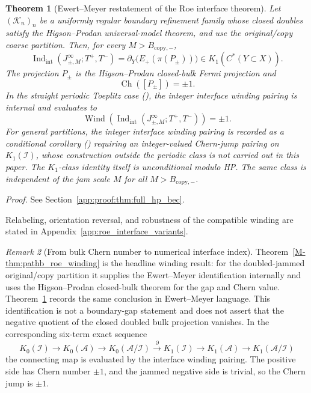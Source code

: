\documentclass[11pt]{article}
\numberwithin{equation}{section}
\newtheorem{theorem}{Theorem}[section]
\theoremstyle{definition}
\theoremstyle{remark}
\newtheorem{remark}[theorem]{Remark}
\newcommand{\proofref}[1]{%
  \par\noindent\emph{Proof.} See Section~\ref{#1}.\par\medskip
}
\newcommand{\proofappendixref}[1]{\proofref{#1}}
\newcommand{\K}{\mathcal{K}}
\newcommand{\Indint}{\operatorname{Ind}_{\mathrm{int}}}
\newcommand{\Ch}{\operatorname{Ch}}
\begin{document}
\begin{theorem}[Ewert--Meyer restatement of the Roe interface theorem]\label{thm:full_hp_bec}
Let \((\K_n)_n\) be a uniformly regular boundary refinement family whose closed doubles satisfy the
Higson--Prodan universal-model theorem, and use the original/copy coarse partition. Then, for every
\(M>B_{\mathrm{copy},-}\),
\[
\Indint(J_{\pm,M}^\infty;T^+,T^-)
=
\partial_Y\!\bigl(E_+(\pi(P_\pm))\bigr)
\in K_1(C^*(Y\subset X)).
\]
The projection \(P_\pm\) is the Higson--Prodan closed-bulk Fermi projection and
\[
\Ch([P_\pm])=\pm1.
\]
In the straight periodic Toeplitz case (), the integer interface
winding pairing is internal and evaluates to
\[
\operatorname{Wind}\!\left(
\Indint(J_{\pm,M}^\infty;T^+,T^-)
\right)
=\pm1.
\]
For general partitions, the integer interface winding pairing is recorded as a conditional
corollary () requiring an integer-valued Chern-jump
pairing on \(K_1(\mathcal I)\), whose construction outside the periodic class is not carried
out in this paper. The \(K_1\)-class identity itself is unconditional modulo HP.  The same
class is independent of the jam scale \(M\) for all \(M>B_{\mathrm{copy},-}\).
\end{theorem}
\proofappendixref{app:proof:thm:full_hp_bec}




Relabeling, orientation reversal, and robustness of the compatible winding are stated in Appendix~\ref{app:roe_interface_variants}.

\begin{remark}[From bulk Chern number to numerical interface index]\label{rem:chern_to_interface}
Theorem~\ref{M-thm:pathb_roe_winding} is the headline winding result: for the doubled-jammed
original/copy partition it supplies the Ewert--Meyer identification internally and uses the
Higson--Prodan closed-bulk theorem for the gap and Chern value. Theorem~\ref{thm:full_hp_bec}
records the same conclusion in Ewert--Meyer language. This identification is not a boundary-gap
statement and does not assert that the negative quotient of the closed doubled bulk projection
vanishes. In the corresponding six-term exact
sequence
\[
K_0(\mathcal I)\to K_0(\mathcal A)\to K_0(\mathcal A/\mathcal I)
\xrightarrow{\;\partial\;}
K_1(\mathcal I)\to K_1(\mathcal A)\to K_1(\mathcal A/\mathcal I)
\]
the connecting map is evaluated by the interface winding pairing. The positive side has Chern
number \(\pm1\), and the jammed negative side is trivial, so the Chern jump is \(\pm1\).
\end{remark}
\end{document}
